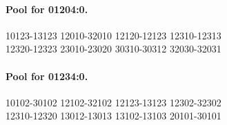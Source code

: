 \documentclass[11pt]{article}
\theoremstyle{remark}
\numberwithin{equation}{section}
\begin{document}
\paragraph{Pool for 01204:0.}
\begingroup\footnotesize\ttfamily\begin{flushleft}
10123-13123 12010-32010 12120-12123 12310-12313\\
12320-12323 23010-23020 30310-30312 32030-32031\\
\end{flushleft}\endgroup
\paragraph{Pool for 01234:0.}
\begingroup\footnotesize\ttfamily\begin{flushleft}
10102-30102 12102-32102 12123-13123 12302-32302\\
12310-12320 13012-13013 13102-13103 20101-30101\\
\end{flushleft}\endgroup
\end{document}
